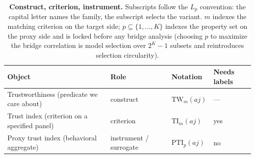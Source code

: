 \documentclass{article}
\newcommand{\TW}{\mathrm{TW}}                    %
\newcommand{\TI}{\mathrm{TI}}                    %
\newcommand{\PTI}{\mathrm{PTI}}                  %
\begin{document}
\begin{table}[h]
  \centering
  \small
  \begin{tabular}{@{}llll@{}}
    \toprule
    \textbf{Object} & \textbf{Role} & \textbf{Notation} & \textbf{Needs labels} \\
    \midrule
    Trustworthiness (predicate we care about) & construct & $\TW_m(aj)$ & --- \\
    Trust index (criterion on a specified panel) & criterion & $\TI_m(aj)$ & yes \\
    Proxy trust index (behavioral aggregate) & instrument / surrogate & $\PTI_p(aj)$ & no \\
    \bottomrule
  \end{tabular}
  \caption{\textbf{Construct, criterion, instrument.} Subscripts follow the $L_p$ convention: the capital letter names the family, the subscript selects the variant. $m$ indexes the matching criterion on the target side; $p \subseteq \{1,\dots,K\}$ indexes the property set on the proxy side and is locked before any bridge analysis (choosing $p$ to maximize the bridge correlation is model selection over $2^K{-}1$ subsets and reintroduces selection circularity).}
  \label{tab:three-objects}
\end{table}
\end{document}
